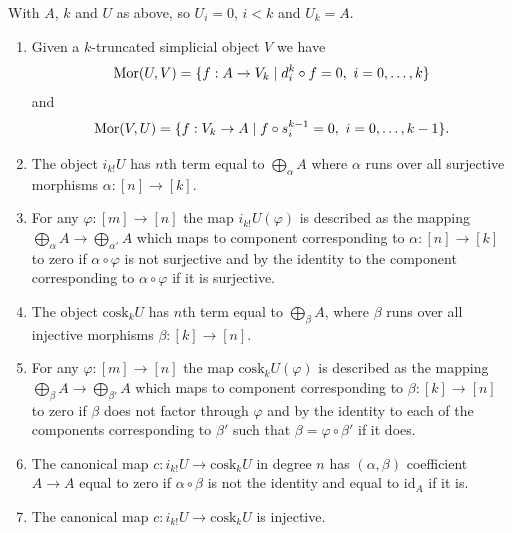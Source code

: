 \begin{lemma}
\label{lemma-eilenberg-maclane-object}
With $A$, $k$ and $U$ as above, so $U_i = 0$, $i < k$ and $U_k = A$.
\begin{enumerate}
\item Given a $k$-truncated simplicial object $V$
we have
$$
\mathop{\mathrm{Mor}}\nolimits(U, V)
=
\{ f : A \to V_k \mid d^k_i \circ f = 0, \ i = 0, \ldots, k \}
$$
and
$$
\mathop{\mathrm{Mor}}\nolimits(V, U)
=
\{ f : V_k \to A \mid f \circ s^{k - 1}_i = 0, \ i = 0, \ldots, k - 1 \}.
$$
\item The object $i_{k!} U$ has $n$th term equal to
$\bigoplus_\alpha A$ where $\alpha$ runs over all
surjective morphisms $\alpha : [n] \to [k]$.
\item For any $\varphi : [m] \to [n]$ the map
$i_{k!} U(\varphi)$ is described as the mapping
$\bigoplus_\alpha A \to \bigoplus_{\alpha'} A$
which maps to component corresponding to $\alpha : [n] \to [k]$
to zero if $\alpha \circ \varphi$ is not surjective and
by the identity to the component corresponding to
$\alpha \circ \varphi$ if it is surjective.
\item The object $\text{cosk}_k U$ has $n$th term equal to
$\bigoplus_\beta A$, where $\beta$ runs over all
injective morphisms $\beta : [k] \to [n]$.
\item For any $\varphi : [m] \to [n]$ the map
$\text{cosk}_k U(\varphi)$ is described as the mapping
$\bigoplus_\beta A \to \bigoplus_{\beta'} A$
which maps to component corresponding to $\beta : [k] \to [n]$
to zero if $\beta$ does not factor through $\varphi$ and
by the identity to each of the components corresponding to
$\beta'$ such that $\beta = \varphi \circ \beta'$
if it does.
\item The canonical map
$
c : i_{k !} U \to \text{cosk}_k U
$
in degree $n$ has $(\alpha, \beta)$ coefficient $A \to A$
equal to zero if $\alpha \circ \beta$ is not the identity
and equal to $\text{id}_A$ if it is.
\item The canonical map
$
c : i_{k !} U \to \text{cosk}_k U
$
is injective.
\end{enumerate}
\end{lemma}

